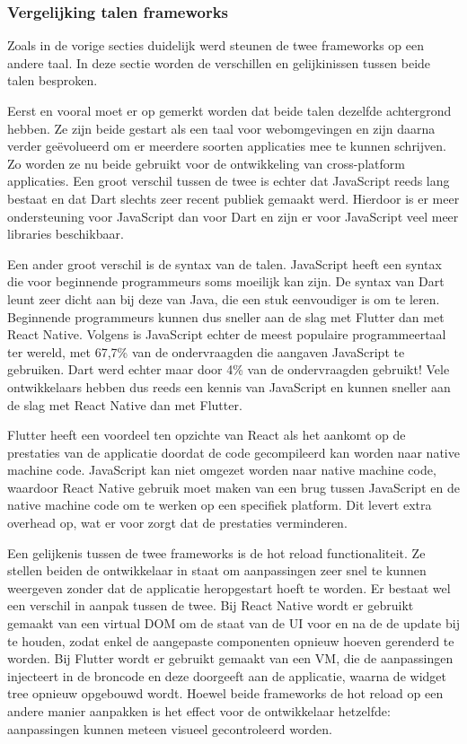 \subsubsection{Vergelijking talen frameworks}
\label{subsubse:vglTalen}

Zoals in de vorige secties duidelijk werd steunen de twee frameworks op een andere taal. In deze sectie worden de verschillen en gelijkinissen tussen beide talen besproken.

Eerst en vooral moet er op gemerkt worden dat beide talen dezelfde achtergrond hebben. Ze zijn beide gestart als een taal voor webomgevingen en zijn daarna verder geëvolueerd om er meerdere soorten applicaties mee te kunnen schrijven. Zo worden ze nu beide gebruikt voor de ontwikkeling van cross-platform applicaties. Een groot verschil tussen de twee is echter dat JavaScript reeds lang bestaat en dat Dart slechts zeer recent publiek gemaakt werd. Hierdoor is er meer ondersteuning voor JavaScript dan voor Dart en zijn er voor JavaScript veel meer libraries beschikbaar.

Een ander groot verschil is de syntax van de talen. JavaScript heeft een syntax die voor beginnende programmeurs soms moeilijk kan zijn. De syntax van Dart leunt zeer dicht aan bij deze van Java, die een stuk eenvoudiger is om te leren. Beginnende programmeurs kunnen dus sneller aan de slag met Flutter dan met React Native. Volgens \textcite{Liu2020a} is JavaScript echter de meest populaire programmeertaal ter wereld, met 67,7\% van de ondervraagden die aangaven JavaScript te gebruiken. Dart werd echter maar door 4\% van de ondervraagden gebruikt! Vele ontwikkelaars hebben dus reeds een kennis van JavaScript en kunnen sneller aan de slag met React Native dan met Flutter.

Flutter heeft een voordeel ten opzichte van React als het aankomt op de prestaties  van de applicatie doordat de code gecompileerd kan worden naar native machine code. JavaScript kan niet omgezet worden naar native machine code, waardoor React Native gebruik moet maken van een brug tussen JavaScript en de native machine code om te werken op een specifiek platform. Dit levert extra overhead op, wat er voor zorgt dat de prestaties verminderen. 

Een gelijkenis tussen de twee frameworks is de hot reload functionaliteit. Ze stellen beiden de ontwikkelaar in staat om aanpassingen zeer snel te kunnen weergeven zonder dat de applicatie heropgestart hoeft te worden. Er bestaat wel een verschil in aanpak tussen de twee. Bij React Native wordt er gebruikt gemaakt van een virtual DOM om de staat van de UI voor en na de de update bij te houden, zodat enkel de aangepaste componenten opnieuw hoeven gerenderd te worden. Bij Flutter wordt er gebruikt gemaakt van een VM, die de aanpassingen injecteert in de broncode en deze doorgeeft aan de applicatie, waarna de widget tree opnieuw opgebouwd wordt. Hoewel beide frameworks de hot reload op een andere manier aanpakken is het effect voor de ontwikkelaar hetzelfde: aanpassingen kunnen meteen visueel gecontroleerd worden.


